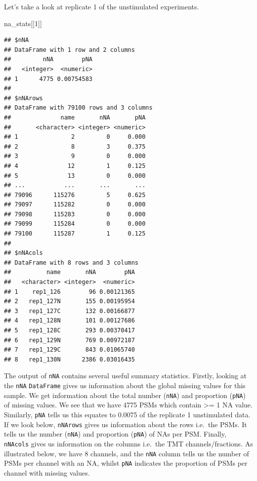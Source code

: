 \documentclass[9pt,a4paper,]{extarticle}
\newenvironment{Shaded}{\begin{snugshade}}{\end{snugshade}}
\newcommand{\DecValTok}[1]{\textcolor[rgb]{0.00,0.00,0.81}{#1}}
\newcommand{\NormalTok}[1]{#1}
\begin{document}
Let's take a look at replicate 1 of the unstimulated experiments.

\begin{Shaded}
\begin{Highlighting}[]
\NormalTok{na\_stats[[}\DecValTok{1}\NormalTok{]]}
\end{Highlighting}
\end{Shaded}

\begin{verbatim}
## $nNA
## DataFrame with 1 row and 2 columns
##         nNA        pNA
##   <integer>  <numeric>
## 1      4775 0.00754583
## 
## $nNArows
## DataFrame with 79100 rows and 3 columns
##              name       nNA       pNA
##       <character> <integer> <numeric>
## 1               2         0     0.000
## 2               8         3     0.375
## 3               9         0     0.000
## 4              12         1     0.125
## 5              13         0     0.000
## ...           ...       ...       ...
## 79096      115276         5     0.625
## 79097      115282         0     0.000
## 79098      115283         0     0.000
## 79099      115284         0     0.000
## 79100      115287         1     0.125
## 
## $nNAcols
## DataFrame with 8 rows and 3 columns
##          name       nNA        pNA
##   <character> <integer>  <numeric>
## 1    rep1_126        96 0.00121365
## 2   rep1_127N       155 0.00195954
## 3   rep1_127C       132 0.00166877
## 4   rep1_128N       101 0.00127686
## 5   rep1_128C       293 0.00370417
## 6   rep1_129N       769 0.00972187
## 7   rep1_129C       843 0.01065740
## 8   rep1_130N      2386 0.03016435
\end{verbatim}

The output of \texttt{nNA} contains several useful summary statistics. Firstly, looking
at the \texttt{nNA} \texttt{DataFrame} gives us information about the global missing values
for this sample. We get information about the total number (\texttt{nNA}) and proportion
(\texttt{pNA}) of missing values. We see that we have 4775 PSMs
which contain \textgreater= 1 NA value. Similarly, \texttt{pNA} tells us this equates to
0.0075 of the replicate 1 unstimulated data.
If we look below, \texttt{nNArows} gives us information about the rows i.e.~the
PSMs. It tells us the number (\texttt{nNA}) and proportion (\texttt{pNA}) of NAs per PSM.
Finally, \texttt{nNAcols} gives us information on the columns i.e.~the TMT channels/fractions.
As illustrated below, we have 8 channels, and the \texttt{nNA} column tells us the number
of PSMs per channel with an NA, whilst \texttt{pNA} indicates the proportion of PSMs per
channel with missing values.
\end{document}
